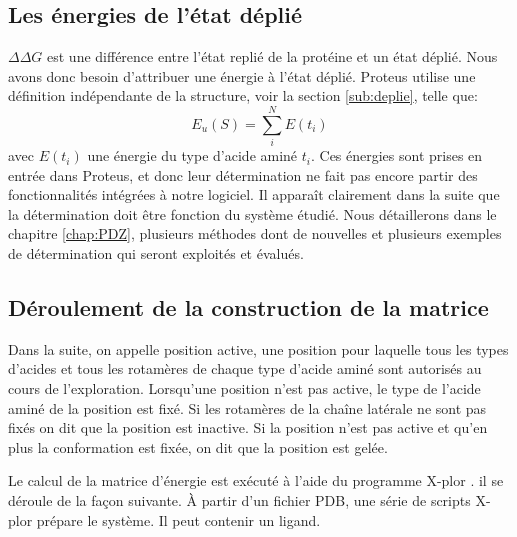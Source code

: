 \subsection{Les énergies de l'état déplié}

$\Delta \Delta G$ est une différence entre l'état replié de la protéine et un état déplié. Nous avons donc besoin d'attribuer une énergie à l'état déplié. Proteus utilise une définition indépendante de la structure, voir la section \vref{sub:deplie}, telle que:
\begin{equation}
E_u(S) = \sum_i^N E(t_i)  
\end{equation}
avec $E(t_i)$ une énergie du type d'acide aminé $t_i$. Ces énergies sont prises en entrée dans Proteus, et donc leur détermination ne fait pas encore partir des fonctionnalités intégrées à notre logiciel. Il apparaît clairement dans la suite que la détermination doit être fonction du système étudié. Nous détaillerons dans le chapitre \ref{chap:PDZ}, plusieurs méthodes dont de nouvelles et plusieurs exemples de détermination qui seront exploités et évalués.

\subsection{Déroulement de la construction de la matrice}
\label{sub:matrix}
Dans la suite, on appelle position active, une position pour laquelle tous les types d'acides et tous les rotamères de chaque type d'acide aminé sont autorisés au cours de l'exploration. Lorsqu'une position n'est pas active, le type de l'acide aminé de la position est fixé. Si les rotamères de la chaîne latérale ne sont pas fixés on dit que la position est inactive. Si la position n'est pas active et qu'en plus la conformation est fixée, on dit que la position est gelée.

Le calcul de la matrice d'énergie est exécuté à l'aide du programme X-plor \cite{Brünger92}. il se déroule de la façon suivante. À partir d'un fichier PDB, une série de scripts X-plor prépare le système. Il peut contenir un ligand.

